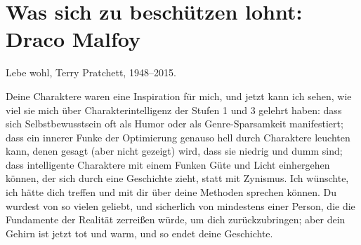 \chapter{Was sich zu beschützen lohnt: Draco Malfoy}

\begin{chapterOpeningAuthorNote}
Lebe wohl, Terry Pratchett, 1948–2015.

Deine Charaktere waren eine Inspiration für mich, und jetzt kann ich sehen, wie viel sie mich über Charakterintelligenz der Stufen 1 und 3 gelehrt haben: dass sich Selbstbewusstsein oft als Humor oder als Genre-Sparsamkeit manifestiert; dass ein innerer Funke der Optimierung genauso hell durch Charaktere leuchten kann, denen gesagt (aber nicht gezeigt) wird, dass sie niedrig und dumm sind; dass intelligente Charaktere mit einem Funken Güte und Licht einhergehen können, der sich durch eine Geschichte zieht, statt mit Zynismus. Ich wünschte, ich hätte dich treffen und mit dir über deine Methoden sprechen können. Du wurdest von so vielen geliebt, und sicherlich von mindestens einer Person, die die Fundamente der Realität zerreißen würde, um dich zurückzubringen; aber dein Gehirn ist jetzt tot und warm, und so endet deine Geschichte.
\begin{verse}

\end{verse}
\end{chapterOpeningAuthorNote}
